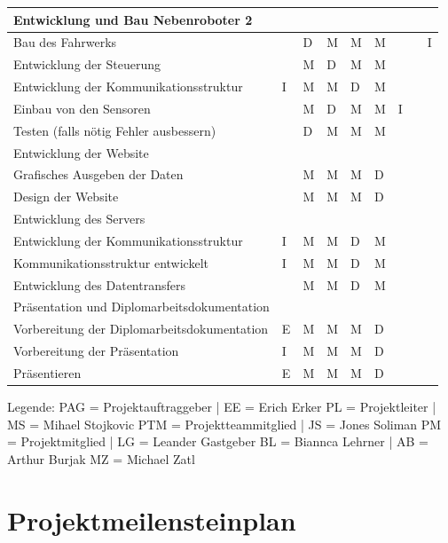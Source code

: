 \begin{longtable}[c]{|p{}|p{1cm}|p{1cm}|p{1cm}|p{1cm}|p{1cm}|p{1cm}|p{1cm}|p{}|}
Entwicklung und Bau Nebenroboter 2 & & & & & & & & \\
\hline
Bau des Fahrwerks & & D & M & M & M & & & I \\
\hline
Entwicklung der Steuerung & & M & D & M & M & & & \\
\hline
Entwicklung der Kommunikationsstruktur & I & M & M & D & M & & & \\
\hline
Einbau von den Sensoren & & M & D & M & M & I & & \\
\hline
Testen (falls nötig Fehler ausbessern) & & D & M & M & M & & & \\
\hline
Entwicklung der Website & & & & & & & & \\
\hline
Grafisches Ausgeben der Daten & & M & M & M & D & & & \\
\hline
Design der Website & & M & M & M & D & & & \\
\hline
Entwicklung des Servers & & & & & & & & \\
\hline
Entwicklung der Kommunikationsstruktur & I & M & M & D & M & & & \\
\hline
Kommunikationsstruktur entwickelt & I & M & M & D & M & & & \\
\hline
Entwicklung des Datentransfers & & M & M & D & M & & & \\
\hline
Präsentation und Diplomarbeitsdokumentation & & & & & & & & \\
\hline
Vorbereitung der Diplomarbeitsdokumentation & E & M & M & M & D & & & \\
\hline
Vorbereitung der Präsentation & I & M & M & M & D & & & \\
\hline
Präsentieren & E & M & M & M & D & & & \\
\hline
\end{longtable}

Legende:
\smallskip
PAG = Projektauftraggeber   |   EE = Erich Erker
PL = Projektleiter          |   MS = Mihael Stojkovic
PTM = Projektteammitglied   |   JS = Jones Soliman
PM = Projektmitglied        |   LG = Leander Gastgeber
BL = Biannca Lehrner        |   AB = Arthur Burjak  
MZ = Michael Zatl

\newpage
\section{Projektmeilensteinplan}

